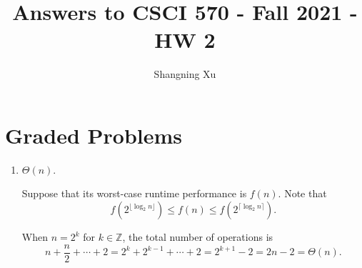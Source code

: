 \documentclass{article}
\title{Answers to CSCI 570 - Fall 2021 - HW 2}
\author{Shangning Xu}
\begin{document}
\maketitle

\section{Graded Problems}

\begin{enumerate}
    \item $\Theta(n)$.
    
    Suppose that its worst-case runtime performance is $f(n)$. Note that
    \[
        f(2^{\lfloor\log_2 n\rfloor}) \le f(n) \le f(2^{\lceil\log_2 n\rceil}).
    \]
    
    When $n = 2^k$ for $k \in \mathbb{Z}$, the total number of operations is
    \[
        n + \frac{n}{2} + \cdots + 2 = 2^k + 2^{k - 1} + \cdots + 2 = 2^{k + 1} - 2 = 2n - 2 = \Theta(n).
    \]
    

\end{enumerate}
\end{document}
